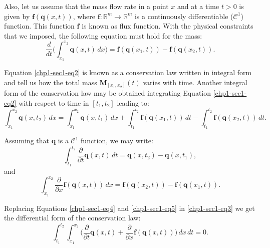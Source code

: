 Also, let us assume that the mass flow rate in a point $x$ and at a time 
$t > 0$ is given by $\mathbf{f}(\mathbf{q}(x,t))$, where $\mathbf{f}:\mathbb{R}^m \to \mathbb{R}^m$ is 
a continuously differentiable ($\mathcal{C}^1$) function. This function $\mathbf{f}$ is known as flux function.
With the physical constraints that we imposed, the following equation must hold for the mass:
\begin{equation}
	\label{chp1-sec1-eq2}
	\frac{d}{dt} \bigg( \int_{x_1}^{x_2} \mathbf{q}(x,t) \,dx \bigg) = 
	\mathbf{f}(\mathbf{q}(x_1,t)) - \mathbf{f}(\mathbf{q}(x_2,t)) .
\end{equation}

Equation \eqref{chp1-sec1-eq2} is known as a conservation law written in integral form and tell us how the total mass 
$\mathbf{M}_{[x_1, x_2]}(t)$ varies with time. Another integral form of the conservation law may be obtained integrating
Equation \eqref{chp1-sec1-eq2} with respect to time in $[t_1, t_2]$ leading to: 
\begin{equation}
	\label{chp1-sec1-eq3}
	\int_{x_1}^{x_2} \mathbf{q}(x, t_2) \,dx = 
	\int_{x_1}^{x_2} \mathbf{q}(x, t_1) \,dx + 
	\int_{t_1}^{t_2} \mathbf{f}(\mathbf{q}(x_1, t)) \,dt -
	\int_{t_1}^{t_2}\mathbf{f}(\mathbf{q}(x_2, t)) \,dt .
\end{equation}

Assuming that $\mathbf{q}$ is a $\mathcal{C}^1$ function, we may write:
\begin{equation}
	\label{chp1-sec1-eq4}
	\int_{t_1}^{t_2} 
	\frac{\partial}{\partial t} \mathbf{q}(x,t) \,dt
	= \mathbf{q}(x, t_2) - \mathbf{q}(x, t_1) ,
\end{equation}
and
\begin{equation}
	\label{chp1-sec1-eq5}
	\int_{x_1}^{x_2} \frac{\partial}{\partial x}\mathbf{f}(\mathbf{q}(x,t)) \,dx 
	= \mathbf{f}(\mathbf{q}(x_2, t)) -
	\mathbf{f}( \mathbf{q}(x_1, t)) .
\end{equation}

Replacing Equations \eqref{chp1-sec1-eq4} and \eqref{chp1-sec1-eq5}
in \eqref{chp1-sec1-eq3} we get the differential form of the conservation law:
\begin{equation}
	\label{chp1-sec1-eq6}
	\int_{t_1}^{t_2} \int_{x_1}^{x_2} 
	\bigg( \frac{\partial}{\partial t}\mathbf{q}(x, t) 
	+ \frac{\partial}{\partial x} \mathbf{f}(\mathbf{q}(x, t)) \bigg) 
	\,dx \,dt  = 0.
\end{equation}

